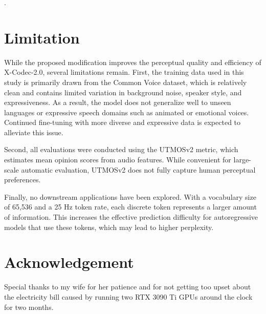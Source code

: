 \documentclass[preprint]{article}
\begin{document}
.

\section{Limitation}

While the proposed modification improves the perceptual quality and efficiency of X-Codec-2.0, several limitations remain.  
First, the training data used in this study is primarily drawn from the Common Voice dataset, which is relatively clean and contains limited variation in background noise, speaker style, and expressiveness. As a result, the model does not generalize well to unseen languages or expressive speech domains such as animated or emotional voices. Continued fine-tuning with more diverse and expressive data is expected to alleviate this issue.

Second, all evaluations were conducted using the UTMOSv2 metric, which estimates mean opinion scores from audio features. While convenient for large-scale automatic evaluation, UTMOSv2 does not fully capture human perceptual preferences.

Finally, no downstream applications have been explored. With a vocabulary size of 65,536 and a 25 Hz token rate, each discrete token represents a larger amount of information. This increases the effective prediction difficulty for autoregressive models that use these tokens, which may lead to higher perplexity.

\section{Acknowledgement}

Special thanks to my wife for her patience and for not getting too upset about the electricity bill
caused by running two RTX 3090 Ti GPUs around the clock for two months.

{}

\end{document}
